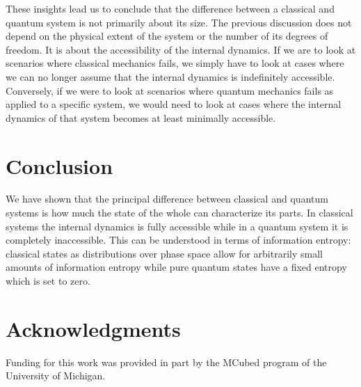 \documentclass{article}
\begin{document}
These insights lead us to conclude that the difference between a classical and quantum system is not primarily about its size. The previous discussion does not depend on the physical extent of the system or the number of its degrees of freedom. It is about the accessibility of the internal dynamics. If we are to look at scenarios where classical mechanics fails, we simply have to look at cases where we can no longer assume that the internal dynamics is indefinitely accessible. Conversely, if we were to look at scenarios where quantum mechanics fails as applied to a specific system, we would need to look at cases where the internal dynamics of that system becomes at least minimally accessible.

\section{Conclusion}

We have shown that the principal difference between classical and quantum systems is how much the state of the whole can characterize its parts. In classical systems the internal dynamics is fully accessible while in a quantum system it is completely inaccessible. This can be understood in terms of information entropy: classical states as distributions over phase space allow for arbitrarily small amounts of information entropy while pure quantum states have a fixed entropy which is set to zero.

\section*{Acknowledgments}

Funding for this work was provided in part by the MCubed program of the University of Michigan.





\end{document}
